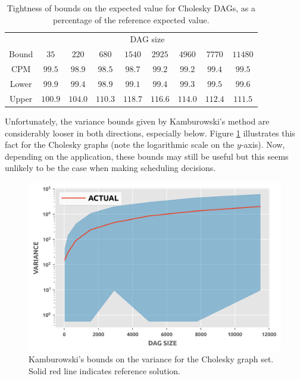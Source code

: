 \documentclass[12pt]{article}
\begin{document}
\begin{table}
	\caption{Tightness of bounds on the expected value for Cholesky DAGs, as a percentage of the reference expected value.} 
	\begin{center}	
		\begin{tabular}{c c c c c c c c c}
                  \cmidrule{1-9}
                  & \multicolumn{8}{c}{DAG size} \\
                  \cmidrule{2-9}
			Bound & $35$ & $220$ & $680$ & $1540$ & $2925$ & $4960$ & $7770$ & $11480$\\
			\cmidrule{1-9}
			CPM & $99.5$ & $98.9$ & $98.5$ & $98.7$ & $99.2$ & $99.2$ & $99.4$ & $99.5$\\
                  Lower & $99.9$ & $99.4$ & $98.9$ & $99.1$ & $99.4$ & $99.3$ & $99.5$ & $99.6$\\
                  Upper & $100.9$ & $104.0$ & $110.3$ & $118.7$ & $116.6$ & $114.0$ & $112.4$ & $111.5$\\
			\bottomrule
		\end{tabular}
		\label{tb.mean_bounds}
	\end{center}	
      \end{table} 

      Unfortunately, the variance bounds given by Kamburowski's method are considerably looser in both directions, especially below. Figure \ref{plot.variance_bounds} illustrates this fact for the Cholesky graphs (note the logarithmic scale on the $y$-axis). Now, depending on the application, these bounds may still be useful but this seems unlikely to be the case when making scheduling decisions.    

      \begin{figure}
	\centering	
	\includegraphics[scale=1.0]{variance_bounds.png}
	\caption{Kamburowski's bounds on the variance for the Cholesky graph set. Solid red line indicates reference solution.}	
	\label{plot.variance_bounds}
      \end{figure}
\end{document}
